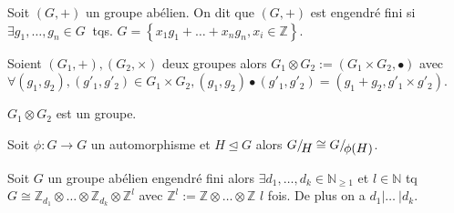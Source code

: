          \begin{definition}
    \label{def:49}
    Soit $(G,+)$ un groupe abélien. On dit que $(G,+)$ est engendré fini si $\exists g_1,\dots,g_n \in G\ $ tqs. $G= \left\{ x_1g_1+\dots+x_ng_n, x_i \in \mathbb{Z} \right\} $.
        \end{definition}
        
        
          \begin{definition}
    \label{def:49}
    Soient $(G_1,+), (G_2,\times)$ deux groupes alors $G_1\otimes G_2 :=(G_1\times G_2, \bullet )$ avec $\forall (g_1,g_2), (g'_1,g'_2) \in G_1\times G_2, (g_1,g_2)\bullet (g'_1,g'_2)= (g_1+g_2, g'_1 \times g'_2)$.
    \end{definition}
    
        \begin{remark}
         $G_1\otimes G_2$ est un groupe.
        \end{remark}
        
        
         \begin{lemma}
    \label{lem:23}
    Soit $\phi:G\rightarrow G$ un automorphisme et $H\unlhd G$ alors $ G/\!\raisebox{-.65ex}{\ensuremath{{H}}} \cong G/\!\raisebox{-.65ex}{\ensuremath{{ \phi (H)}}}$.
    \end{lemma}
        
          \begin{theorem}
    \label{thr:28}
    Soit $G$ un groupe abélien engendré fini alors $\exists d_1,\dots,d_k \in \mathbb{N}_{ \ge 1}$ et $l\in \mathbb{N}$ tq $G  \cong \mathbb{Z}_{d_1} \otimes \dots \otimes \mathbb{Z}_{d_k} \otimes \mathbb{Z}^l$ avec $\mathbb{Z}^l:=\mathbb{Z} \otimes \dots 
   \otimes \mathbb{Z}$ $l$ fois. De plus on a $d_1|\dots\ |d_k$.
    \end{theorem}
    
